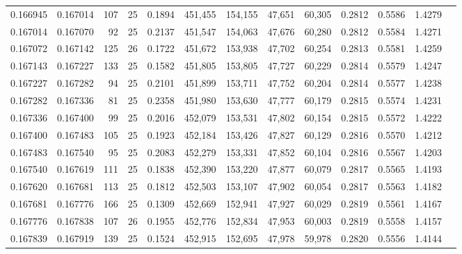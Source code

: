 \begin{tabular}{rrrrrrrrrrrrr}
0.166945 & 0.167014 &   107 &  25 &                                     0.1894 & 451,455 & 154,155 &  47,651 &  60,305 & 0.2812 & 0.5586 & 1.4279 \\
0.167014 & 0.167070 &    92 &  25 &                                     0.2137 & 451,547 & 154,063 &  47,676 &  60,280 & 0.2812 & 0.5584 & 1.4271 \\
0.167072 & 0.167142 &   125 &  26 &                                     0.1722 & 451,672 & 153,938 &  47,702 &  60,254 & 0.2813 & 0.5581 & 1.4259 \\
0.167143 & 0.167227 &   133 &  25 &                                     0.1582 & 451,805 & 153,805 &  47,727 &  60,229 & 0.2814 & 0.5579 & 1.4247 \\
0.167227 & 0.167282 &    94 &  25 &                                     0.2101 & 451,899 & 153,711 &  47,752 &  60,204 & 0.2814 & 0.5577 & 1.4238 \\
0.167282 & 0.167336 &    81 &  25 &                                     0.2358 & 451,980 & 153,630 &  47,777 &  60,179 & 0.2815 & 0.5574 & 1.4231 \\
0.167336 & 0.167400 &    99 &  25 &                                     0.2016 & 452,079 & 153,531 &  47,802 &  60,154 & 0.2815 & 0.5572 & 1.4222 \\
0.167400 & 0.167483 &   105 &  25 &                                     0.1923 & 452,184 & 153,426 &  47,827 &  60,129 & 0.2816 & 0.5570 & 1.4212 \\
0.167483 & 0.167540 &    95 &  25 &                                     0.2083 & 452,279 & 153,331 &  47,852 &  60,104 & 0.2816 & 0.5567 & 1.4203 \\
0.167540 & 0.167619 &   111 &  25 &                                     0.1838 & 452,390 & 153,220 &  47,877 &  60,079 & 0.2817 & 0.5565 & 1.4193 \\
0.167620 & 0.167681 &   113 &  25 &                                     0.1812 & 452,503 & 153,107 &  47,902 &  60,054 & 0.2817 & 0.5563 & 1.4182 \\
0.167681 & 0.167776 &   166 &  25 &                                     0.1309 & 452,669 & 152,941 &  47,927 &  60,029 & 0.2819 & 0.5561 & 1.4167 \\
0.167776 & 0.167838 &   107 &  26 &                                     0.1955 & 452,776 & 152,834 &  47,953 &  60,003 & 0.2819 & 0.5558 & 1.4157 \\
0.167839 & 0.167919 &   139 &  25 &                                     0.1524 & 452,915 & 152,695 &  47,978 &  59,978 & 0.2820 & 0.5556 & 1.4144 \\

\end{tabular}
